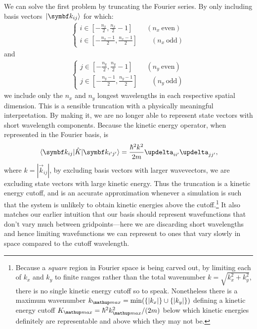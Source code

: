 We can solve the first problem by truncating the Fourier series. By only including basis vectors $\ket{\vec k_{ij}}$ for which:
\begin{align}
\begin{cases}
i \in [-\tfrac{n_x}2, \tfrac{n_x}2 - 1] \qquad (n_x\ \textrm{even})\\
i \in [-\tfrac{n_x - 1}2, \tfrac{n_x - 1}2] \qquad (n_x\ \textrm{odd})
\end{cases}
\end{align}
and
\begin{align}
\begin{cases}
j \in [-\tfrac{n_y}2, \tfrac{n_y}2 - 1] \qquad (n_y\ \textrm{even})\\
j \in [-\tfrac{n_y - 1}2, \tfrac{n_y - 1}2] \qquad (n_y\ \textrm{odd})
\end{cases}
\end{align}
we include only the $n_x$ and $n_y$ longest wavelengths in each respective spatial dimension. This is a sensible truncation with a physically meaningful interpretation. By making it, we are no longer able to represent state vectors with short wavelength components. Because the kinetic energy operator, when represented in the Fourier basis, is
\begin{align}
\matrixel{\vec k_{ij}}{\hat K}{\vec k_{i^\prime j^\prime}} = \frac{\hbar^2 k^2}{2m}\updelta_{ii^\prime}\updelta_{jj^\prime},
\end{align}
where $k = |\vec k_{ij}|$, by excluding basis vectors with larger wavevectors, we are excluding state vectors with large kinetic energy. Thus the truncation is a kinetic energy cutoff, and is an accurate approximation whenever a simulation is such that the system is unlikely to obtain kinetic energies above the cutoff.\footnote{Because a \emph{square} region in Fourier space is being carved out, by limiting each of $k_x$ and $k_y$ to finite ranges rather than the total wavenumber $k = \sqrt{k_x^2 + k_y^2}$, there is no single kinetic energy cutoff so to speak. Nonetheless there is a maximum wavenumber $k_\up{max} = \min(\{|k_x|\} \cup \{|k_y|\})$ defining a kinetic energy cutoff $K_\up{max} = \hbar^2k_\up{max}^2/(2m)$ below which kinetic energies definitely are representable and above which they may not be.} It also matches our earlier intuition that our basis should represent wavefunctions that don't vary much between gridpoints---here we are discarding short wavelengths and hence limiting wavefunctions we can represent to ones that vary slowly in space compared to the cutoff wavelength.

